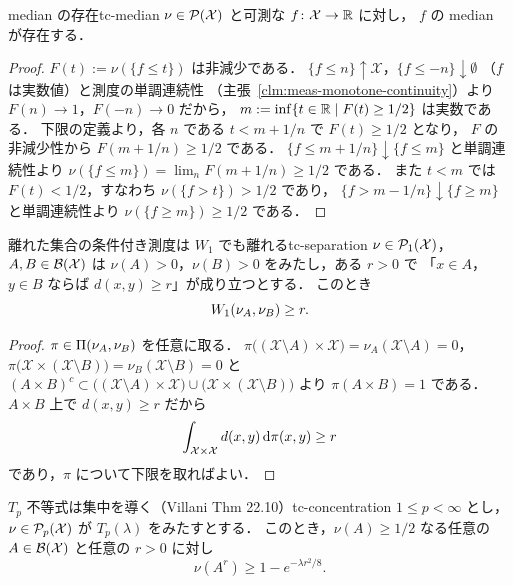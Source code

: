 \begin{lemma}{median の存在}{tc-median}
  $\nu\in\mathcal{P}(\mathcal{X})$ と可測な $f\colon\mathcal{X}\to\mathbb{R}$ に対し，
  $f$ の median が存在する．
\end{lemma}

\begin{proof}
  $F(t):=\nu(\{f\leq t\})$ は非減少である．
  $\{f\leq n\}\uparrow\mathcal{X}$，$\{f\leq-n\}\downarrow\emptyset$
  （$f$ は実数値）と測度の単調連続性
  （主張~\ref{clm:meas-monotone-continuity}）より
  $F(n)\to1$，$F(-n)\to0$ だから，
  $m:=\inf\{t\in\mathbb{R}\mid F(t)\geq1/2\}$ は実数である．
  下限の定義より，各 $n$ である $t<m+1/n$ で $F(t)\geq1/2$ となり，
  $F$ の非減少性から $F(m+1/n)\geq1/2$ である．
  $\{f\leq m+1/n\}\downarrow\{f\leq m\}$ と単調連続性より
  $\nu(\{f\leq m\})=\lim_nF(m+1/n)\geq1/2$ である．
  また $t<m$ では $F(t)<1/2$，すなわち $\nu(\{f>t\})>1/2$ であり，
  $\{f>m-1/n\}\downarrow\{f\geq m\}$ と単調連続性より
  $\nu(\{f\geq m\})\geq1/2$ である．
\end{proof}

\begin{lemma}{離れた集合の条件付き測度は $W_1$ でも離れる}{tc-separation}
  $\nu\in\mathcal{P}_{1}(\mathcal{X})$，$A,B\in\mathcal{B}(\mathcal{X})$ は
  $\nu(A)>0$，$\nu(B)>0$ をみたし，ある $r>0$ で
  「$x\in A$，$y\in B$ ならば $d(x,y)\geq r$」が成り立つとする．
  このとき
  \[
    W_1(\nu_A,\nu_B)\geq r.
  \]
\end{lemma}

\begin{proof}
  $\pi\in\Pi(\nu_A,\nu_B)$ を任意に取る．
  $\pi\bigl((\mathcal{X}\setminus A)\times\mathcal{X}\bigr)
  =\nu_A(\mathcal{X}\setminus A)=0$，
  $\pi\bigl(\mathcal{X}\times(\mathcal{X}\setminus B)\bigr)
  =\nu_B(\mathcal{X}\setminus B)=0$ と
  $(A\times B)^c\subset
  \bigl((\mathcal{X}\setminus A)\times\mathcal{X}\bigr)
  \cup\bigl(\mathcal{X}\times(\mathcal{X}\setminus B)\bigr)$ より
  $\pi(A\times B)=1$ である．
  $A\times B$ 上で $d(x,y)\geq r$ だから
  \[
    \int_{\mathcal{X}\times\mathcal{X}}d(x,y)\,\mathrm{d}\pi(x,y)\geq r
  \]
  であり，$\pi$ について下限を取ればよい．
\end{proof}

\begin{theorem}{$T_p$ 不等式は集中を導く（Villani Thm 22.10）}{tc-concentration}
  $1\leq p<\infty$ とし，$\nu\in\mathcal{P}_{p}(\mathcal{X})$ が
  $T_p(\lambda)$ をみたすとする．
  このとき，$\nu(A)\geq1/2$ なる任意の
  $A\in\mathcal{B}(\mathcal{X})$ と任意の $r>0$ に対し
  \[
    \nu(A^r)\geq1-e^{-\lambda r^2/8}.
  \]
\end{theorem}

